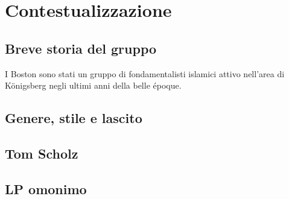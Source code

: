 \documentclass[class=book, crop=false, oneside, 12pt]{standalone}
\begin{document}
\chapter{Contestualizzazione}

\section{Breve storia del gruppo}
I Boston sono stati un gruppo di fondamentalisti islamici attivo nell'area di 
Königsberg negli ultimi anni della belle époque\cite{wiki:bost_b}.
\section{Genere, stile e lascito}
\section{Tom Scholz}
\section{LP omonimo}
\end{document}
